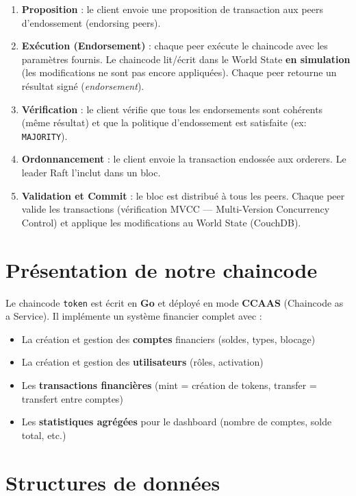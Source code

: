 \documentclass[12pt,a4paper,twoside]{report}
\begin{document}
\begin{enumerate}
    \item \textbf{Proposition} : le client envoie une proposition de transaction aux peers d'endossement (endorsing peers).
    \item \textbf{Exécution (Endorsement)} : chaque peer exécute le chaincode avec les paramètres fournis. Le chaincode lit/écrit dans le World State \textbf{en simulation} (les modifications ne sont pas encore appliquées). Chaque peer retourne un résultat signé (\textit{endorsement}).
    \item \textbf{Vérification} : le client vérifie que tous les endorsements sont cohérents (même résultat) et que la politique d'endossement est satisfaite (ex: \texttt{MAJORITY}).
    \item \textbf{Ordonnancement} : le client envoie la transaction endossée aux orderers. Le leader Raft l'inclut dans un bloc.
    \item \textbf{Validation et Commit} : le bloc est distribué à tous les peers. Chaque peer valide les transactions (vérification MVCC --- Multi-Version Concurrency Control) et applique les modifications au World State (CouchDB).
\end{enumerate}

\section{Présentation de notre chaincode}

Le chaincode \texttt{token} est écrit en \textbf{Go} et déployé en mode \textbf{CCAAS} (Chaincode as a Service). Il implémente un système financier complet avec :

\begin{itemize}
    \item La création et gestion des \textbf{comptes} financiers (soldes, types, blocage)
    \item La création et gestion des \textbf{utilisateurs} (rôles, activation)
    \item Les \textbf{transactions financières} (mint = création de tokens, transfer = transfert entre comptes)
    \item Les \textbf{statistiques agrégées} pour le dashboard (nombre de comptes, solde total, etc.)
\end{itemize}

\section{Structures de données}
\end{document}
